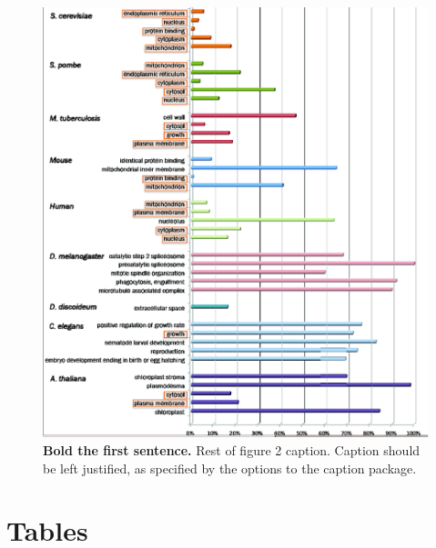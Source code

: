 \documentclass[12pt]{article}
\begin{document}
\begin{figure}[!ht]
\begin{center}
\includegraphics[width=6in]{rel-contrib.eps}
\end{center}
\caption{
{\bf Bold the first sentence.}  Rest of figure 2  caption.  Caption 
should be left justified, as specified by the options to the caption 
package.
}
\label{fig:rel-contrib}
\end{figure}

\section*{Tables}
\end{document}
